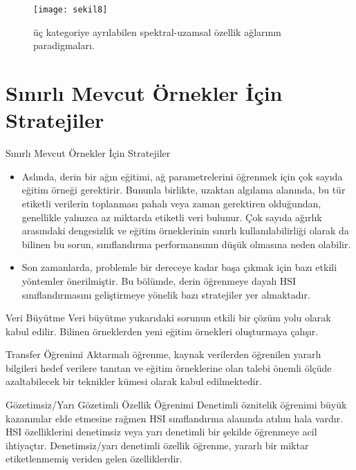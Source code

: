 \documentclass{beamer}
\begin{document}
\begin{frame}
\begin{figure}[]
	\centering
	\texttt{[image: sekil8]}
	\label{fig:sekil4}
	\caption{üç kategoriye ayrılabilen spektral-uzamsal özellik ağlarının paradigmaları.}
\end{figure}
\end{frame}

\section{Sınırlı Mevcut Örnekler İçin Stratejiler}
\begin{frame}{Sınırlı Mevcut Örnekler İçin Stratejiler}
\begin{itemize}
	\item Aslında, derin bir ağın eğitimi, ağ parametrelerini öğrenmek için çok sayıda eğitim örneği gerektirir. Bununla birlikte, uzaktan algılama alanında, bu tür etiketli verilerin toplanması pahalı veya zaman gerektiren olduğundan, genellikle yalnızca az miktarda etiketli veri bulunur. Çok sayıda ağırlık arasındaki dengesizlik ve eğitim örneklerinin sınırlı kullanılabilirliği olarak da bilinen bu sorun, sınıflandırma performansının düşük olmasına neden olabilir. 

	\item Son zamanlarda, problemle bir dereceye kadar başa çıkmak için bazı etkili yöntemler önerilmiştir. Bu bölümde, derin öğrenmeye dayalı HSI sınıflandırmasını geliştirmeye yönelik bazı stratejiler yer almaktadır.
\end{itemize}
\end{frame}

\begin{frame}{Veri Büyütme}
Veri büyütme yukarıdaki sorunun etkili bir çözüm yolu olarak kabul edilir. Bilinen örneklerden yeni eğitim örnekleri oluşturmaya çalışır.
\end{frame}

\begin{frame}{Transfer Öğrenimi}
Aktarmalı öğrenme, kaynak verilerden öğrenilen yararlı bilgileri hedef verilere tanıtan ve eğitim örneklerine olan talebi önemli ölçüde azaltabilecek bir teknikler kümesi olarak kabul edilmektedir.
\end{frame}

\begin{frame}{Gözetimsiz/Yarı Gözetimli Özellik Öğrenimi}
Denetimli öznitelik öğrenimi büyük kazanımlar elde etmesine rağmen HSI sınıflandırma alanında atılım hala vardır. HSI özelliklerini denetimsiz veya yarı denetimli bir şekilde öğrenmeye acil ihtiyaçtır. Denetimsiz/yarı denetimli özellik öğrenme, yararlı bir miktar etiketlenmemiş veriden gelen özelliklerdir.
\end{frame}
\end{document}
